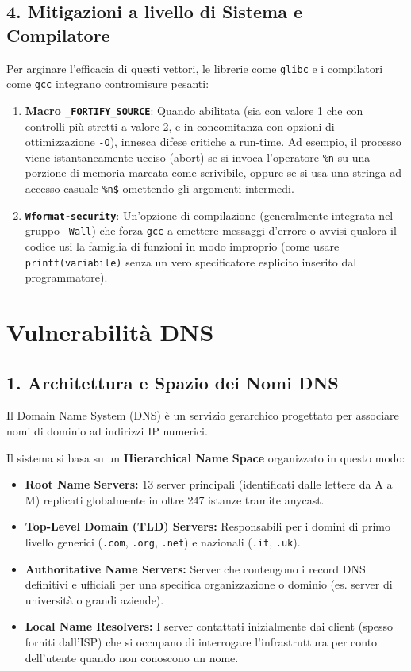 \documentclass{article}
\begin{document}
\subsection{4. Mitigazioni a livello di Sistema e Compilatore}
Per arginare l'efficacia di questi vettori, le librerie come \texttt{glibc} e i compilatori come \texttt{gcc} integrano contromisure pesanti:
\begin{enumerate}
    \item \textbf{Macro \texttt{\_FORTIFY\_SOURCE}}: Quando abilitata (sia con valore 1 che con controlli più stretti a valore 2, e in concomitanza con opzioni di ottimizzazione \texttt{-O}), innesca difese critiche a run-time. Ad esempio, il processo viene istantaneamente ucciso (abort) se si invoca l'operatore \texttt{\%n} su una porzione di memoria marcata come scrivibile, oppure se si usa una stringa ad accesso casuale \texttt{\%n\$} omettendo gli argomenti intermedi.
    \item \textbf{\texttt{Wformat-security}}: Un'opzione di compilazione (generalmente integrata nel gruppo \texttt{-Wall}) che forza \texttt{gcc} a emettere messaggi d'errore o avvisi qualora il codice usi la famiglia di funzioni in modo improprio (come usare \texttt{printf(variabile)} senza un vero specificatore esplicito inserito dal programmatore).
\end{enumerate}


\section{Vulnerabilità DNS}

\subsection{1. Architettura e Spazio dei Nomi DNS}
Il Domain Name System (DNS) è un servizio gerarchico progettato per associare nomi di dominio ad indirizzi IP numerici.

Il sistema si basa su un \textbf{Hierarchical Name Space} organizzato in questo modo:
\begin{itemize}
    \item \textbf{Root Name Servers:} 13 server principali (identificati dalle lettere da A a M) replicati globalmente in oltre 247 istanze tramite anycast.
    \item \textbf{Top-Level Domain (TLD) Servers:} Responsabili per i domini di primo livello generici (\texttt{.com}, \texttt{.org}, \texttt{.net}) e nazionali (\texttt{.it}, \texttt{.uk}).
    \item \textbf{Authoritative Name Servers:} Server che contengono i record DNS definitivi e ufficiali per una specifica organizzazione o dominio (es. server di università o grandi aziende).
    \item \textbf{Local Name Resolvers:} I server contattati inizialmente dai client (spesso forniti dall'ISP) che si occupano di interrogare l'infrastruttura per conto dell'utente quando non conoscono un nome.
\end{itemize}
\end{document}
